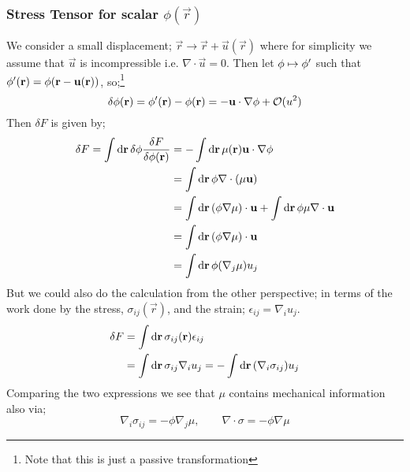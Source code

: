 \subsubsection{Stress Tensor for scalar $\phi(\vec r)$}
We consider a small displacement; $\vec r \rightarrow \vec r + \vec{u}(\vec{r})$ where for simplicity we assume that $\vec{u}$ is incompressible i.e. $\nabla\cdot \vec{u}= 0$. Then let $\phi\mapsto \phi^{\prime}$ such that $\phi\pr\left(\vec r) = \phi(\vec r - \vec{u}(\vec r)\right)$, so;\footnote{Note that this is just a passive transformation}
\begin{equation}
\delta \phi(\mathbf r) = \phi^{\prime}(\mathbf r) - \phi(\mathbf r) = - \mathbf{u} \cdot \nabla \phi + \mathcal{O}(u^2)
\end{equation}
Then $\delta F$ is given by;
\begin{align*}
\delta F = \int{\text{d}\mathbf r \,\delta \phi \frac{\delta F}{\delta \phi(\mathbf r)}} &= - \int{\text{d}\mathbf r \,\mu(\mathbf r)\mathbf{u}\cdot \nabla \phi} \\
&= \int{\text{d}\mathbf r \,\phi \nabla\cdot(\mu \mathbf{u})} \\
&= \int{\text{d}\mathbf{r} \,(\phi \nabla \mu)\cdot \mathbf{u}} + \int{\text{d}\mathbf r \,\phi\mu \nabla\cdot \mathbf{u}} \\
&= \int{\text{d}\mathbf r \, (\phi \nabla \mu)\cdot \mathbf{u}} \\
&= \int{\text{d}\mathbf r \,\phi(\nabla_j \mu)u_j}
\end{align*}
But we could also do the calculation from the other perspective; in terms of the work done by the stress, $\sigma_{ij}(\vec r)$, and the strain; $\epsilon_{ij} = \nabla_i u_j$.
\begin{align*}
\delta F &= \int{\text{d}\mathbf r \, \sigma_{ij}(\mathbf r) \epsilon_{ij}} \\
&= \int{\text{d}\mathbf r \,\sigma_{ij}\nabla_i u_j} = -\int{\text{d}\mathbf r \,(\nabla_i \sigma_{ij})u_j}
\end{align*}
Comparing the two expressions we see that $\mu$ contains mechanical information also via;
\begin{equation}
\nabla_i \sigma_{ij} = -\phi \nabla_j \mu, \qquad \nabla \cdot \sigma = -\phi \nabla\mu
\end{equation}
